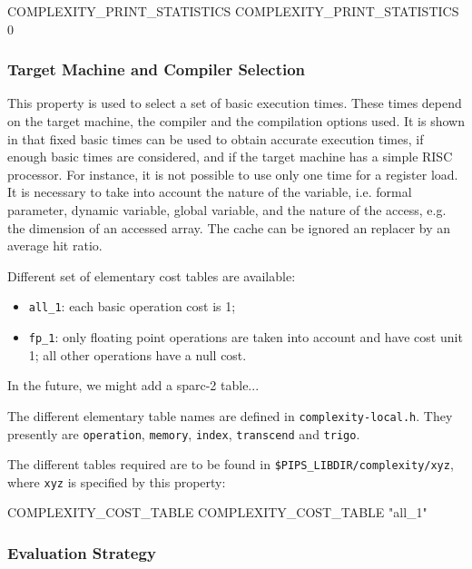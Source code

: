 \documentclass[a4paper]{report}
\begin{document}
\begin{PipsProp}{COMPLEXITY_PRINT_STATISTICS}
COMPLEXITY_PRINT_STATISTICS 0
\end{PipsProp}

\subsubsection{Target Machine and Compiler Selection}

This property is used to select a set of basic execution times. These
times depend on the target machine, the compiler and the compilation
options used. It is shown in \cite{Zho94} that fixed basic times can be
used to obtain accurate execution times, if enough basic times are
considered, and if the target machine has a simple RISC processor. For
instance, it is not possible to use only one time for a register
load. It is necessary to take into account the nature of the variable,
i.e. formal parameter, dynamic variable, global variable, and the nature
of the access, e.g. the dimension of an accessed array. The cache can be
ignored an replacer by an average hit ratio.

Different set of elementary cost tables are available:

\begin{itemize}

  \item \verb+all_1+: each basic operation cost is 1;

  \item \verb+fp_1+: only floating point operations are taken into
account and have cost unit 1; all other operations have a null cost.

\end{itemize}

In the future, we might add a sparc-2 table...

The different elementary table names are defined in
\verb+complexity-local.h+. They presently are \verb+operation+,
\verb+memory+, \verb+index+, \verb+transcend+
and \verb+trigo+.

The different tables required are to be found in
\verb+$PIPS_LIBDIR/complexity/xyz+,
where \verb+xyz+ is specified by this property:

\begin{PipsProp}{COMPLEXITY_COST_TABLE}
COMPLEXITY_COST_TABLE "all_1"
\end{PipsProp}

\subsubsection{Evaluation Strategy}
\end{document}
